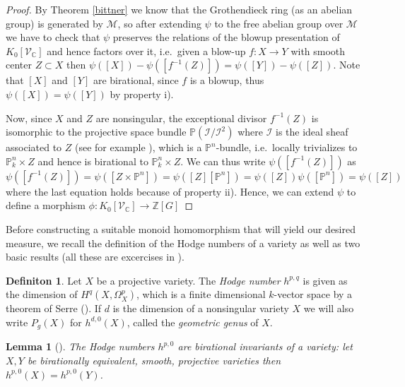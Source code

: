 \documentclass[11pt, a4paper, german]{article}
\theoremstyle{plain}
\newtheorem{lemma}[theorem]{Lemma}
\theoremstyle{definition}
\newtheorem{definition}[theorem]{Definiton}
\newcommand{\gring}[1][k]{K_0[\mathcal{V}_#1]}
\begin{document}
\begin{proof}
    By Theorem \ref{bittner} we know that the Grothendieck ring (as an abelian group) is generated by $\mathcal{M}$, so after extending $\psi$ to
    the free abelian group over $\mathcal{M}$ 
    we have to check that $\psi$ preserves the relations of the blowup presentation of $\gring[\mathbb{C}]$ and hence factors over it,
    i.e.\ given a blow-up $f \colon X \to Y$ with smooth center $Z \subset X$ then $\psi([X]) - \psi([f^{-1}(Z)]) = \psi([Y]) - \psi([Z])$. 
    Note that $[X]$ and $[Y]$ are birational, since $f$ is a blowup, thus $\psi([X]) = \psi([Y])$ by property i).
    
    Now, since $X$ and $Z$ are nonsingular, the exceptional divisor $f^{-1}(Z)$ is isomorphic to 
    the projective space bundle  $\mathbb{P}(\mathcal{I}/\mathcal{I}^2)$ 
    where $\mathcal{I}$ is the ideal sheaf associated to $Z$ (see for example \cite[II.8, Thm 8.24]{Ha}),
    which is a $\mathbb{P}^n$-bundle, i.e.\ locally trivializes to $\mathbb{P}_k^n \times Z$
    and hence is birational to $\mathbb{P}_k^n \times Z$. 
    We can thus write $\psi([f^{-1}(Z)])$ as  
    \[
        \psi([f^{-1}(Z)]) = \psi([Z \times \mathbb{P}^n]) = \psi([Z][\mathbb{P}^n]) = \psi([Z])\psi([\mathbb{P}^n]) = \psi([Z])
    \]
    where the last equation holds because of property ii).
    Hence, we can extend $\psi$ to define a morphism $\phi \colon \gring[\mathbb{C}] \to \mathbb{Z} [G]$
\end{proof}

Before constructing a suitable monoid homomorphism that will yield our desired measure, we recall the definition of the Hodge numbers
of a variety as well as two basic results (all these are excercises in \cite[Ch. II]{Ha}).

\begin{definition}
    Let $X$ be a projective variety. The \emph{Hodge number} $h^{p,q}$ is given as the dimension of $H^q(X,\Omega^p_X)$, 
    which is a finite dimensional $k$-vector space by a theorem of Serre (\cite[§3 Prop. 7]{FAC}).
    If $d$ is the dimension of a nonsingular variety $X$ we will also write $P_g(X)$ for $h^{d,0}(X)$, called the \emph{geometric genus} of $X$.
\end{definition}


\begin{lemma}[{\cite[II Ex. 8.8]{Ha}}]
    \label{bir}
    The Hodge numbers $h^{p,0}$ are birational invariants of a variety: let $X, Y$ be birationally equivalent, smooth, projective varieties
    then $h^{p,0}(X) = h^{p,0}(Y)$.
\end{lemma}
\end{document}
